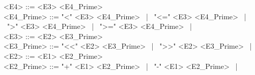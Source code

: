 \begin{grammar}
<E4> ::= <E3> <E4_Prime> \\
<E4_Prime> ::= "<" <E3> <E4_Prime> \ | \ "<=" <E3> <E4_Prime> \ | \ ">" <E3> <E4_Prime> \ | \ ">=" <E3> <E4_Prime> \ | \ \epsilon \\

<E3> ::= <E2> <E3_Prime> \\
<E3_Prime> ::= "<<" <E2> <E3_Prime> \ | \ ">>" <E2> <E3_Prime> \ | \ \epsilon \\

<E2> ::= <E1> <E2_Prime> \\
<E2_Prime> ::= "+" <E1> <E2_Prime> \ | \ "-" <E1> <E2_Prime> \ | \ \epsilon \\

\end{grammar}
